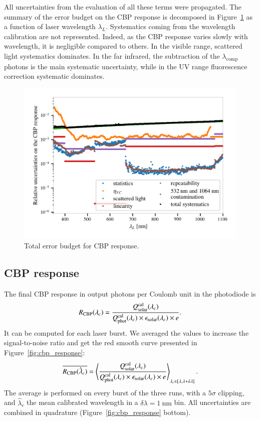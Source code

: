 All uncertainties from the evaluation of all these terms were propagated. The summary of the error budget on the CBP response is decomposed in Figure~\ref{fig:cbp_budget} as a function of laser wavelength $\lambda_L$. Systematics coming from the wavelength calibration are not represented. Indeed, as the CBP response varies slowly with wavelength, it is negligible compared to others.  In the visible range, scattered light systematics dominates. In the far infrared, the subtraction of the $\lambda_{\mathrm{comp}}$ photons is the main systematic uncertainty, while in the UV range fluorescence correction systematic dominates.

\begin{figure}[h]
    \centering
    \includegraphics[width=\columnwidth]{fig/cbp_error_budget.png}
    \caption{Total error budget for CBP response.}
    \label{fig:cbp_budget}
\end{figure}

\subsection{CBP response}

The final CBP response in output photons per Coulomb unit in the photodiode is
\begin{equation}
    R_{\mathrm{CBP}}(\lambda_c) = \frac{Q_{\mathrm{solar}}^{\mathrm{cal}}(\lambda_c)}{Q_{\mathrm{phot}}^{\mathrm{cal}}(\lambda_c) \times \epsilon_{\mathrm{solar}}(\lambda_c) \times e}.
    \label{eq:rcbp2}
\end{equation} 
It can be computed for each laser burst. We averaged the values to increase the signal-to-noise ratio and get the red smooth curve presented in Figure~\ref{fig:cbp_response}:
\begin{equation}
    \overline{R_{\mathrm{CBP}}(\hat{\lambda}_c)} = \left\langle\frac{Q_{\mathrm{solar}}^{\mathrm{cal}}(\lambda_c)}{Q_{\mathrm{phot}}^{\mathrm{cal}}(\lambda_c) \times \epsilon_{\mathrm{solar}}(\lambda_c) \times e}\right\rangle_{\lambda_c\in [\lambda,\lambda+\delta \lambda]}.
    \label{eq:rcbp3}
\end{equation} 
The average is performed on every burst of the three runs, with a $5\sigma$ clipping, and $\hat{\lambda}_c$ the mean calibrated wavelength in a $\delta \lambda = \SI{1}{\nano\meter}$ bin. All uncertainties are combined in quadrature (Figure~\ref{fig:cbp_response} bottom).



